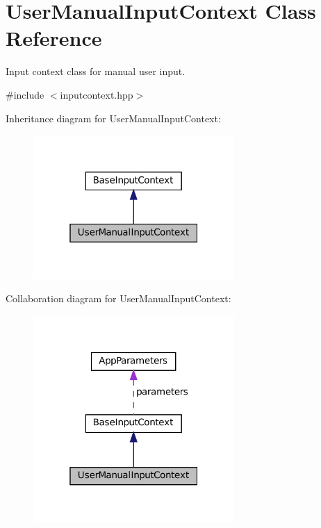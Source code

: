 \hypertarget{classUserManualInputContext}{}\section{User\+Manual\+Input\+Context Class Reference}
\label{classUserManualInputContext}


Input context class for manual user input.  




{\ttfamily \#include $<$inputcontext.\+hpp$>$}



Inheritance diagram for User\+Manual\+Input\+Context\+:\nopagebreak
\begin{figure}[H]
\begin{center}
\leavevmode
\includegraphics[width=217pt]{classUserManualInputContext__inherit__graph}
\end{center}
\end{figure}


Collaboration diagram for User\+Manual\+Input\+Context\+:\nopagebreak
\begin{figure}[H]
\begin{center}
\leavevmode
\includegraphics[width=217pt]{classUserManualInputContext__coll__graph}
\end{center}
\end{figure}
